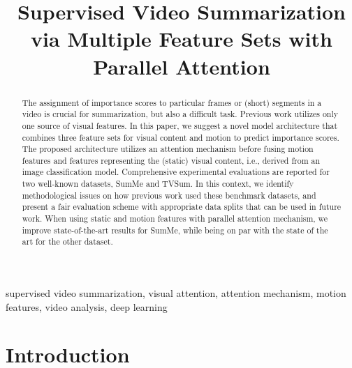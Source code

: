 \documentclass{article}
\begin{document}
\sloppy

					  
					  
				   
				

\title{Supervised Video Summarization via Multiple Feature Sets with Parallel Attention}

		
		
																						
																											
 
\address{$^1$ TIB -- Leibniz Information Centre for Science and Technology, Hannover, Germany
\\
$^2$ L3S Research Center, Leibniz University Hannover, Germany\\
\{junaid.ghauri, sherzod.hakimov, ralph.ewerth\}@tib.eu}

\maketitle


\begin{abstract}
The assignment of importance scores to particular frames or (short) segments in a video is crucial for summarization, but also a difficult task. Previous work utilizes only one source of visual features. 
In this paper, we suggest a novel model architecture that combines three feature sets for visual content and motion to predict importance scores.
The proposed architecture utilizes an attention mechanism before fusing motion features and features representing the (static) visual content, i.e., derived from an image classification model.
Comprehensive experimental evaluations are reported for two well-known datasets, SumMe and TVSum. 
In this context, we identify methodological issues on how previous work used these benchmark datasets, and present a fair evaluation scheme with appropriate data splits that can be used in future work. 
When using static and motion features with parallel attention mechanism, we improve state-of-the-art results for SumMe, while being on par with the state of the art for the other dataset.

\end{abstract}
\begin{keywords}
supervised video summarization, visual attention, attention mechanism, motion features, video analysis, deep learning
\end{keywords}
\section{Introduction}
\label{sec:intro}
\end{document}
